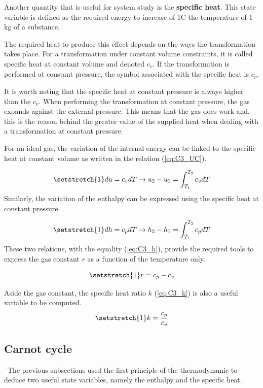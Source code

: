 Another quantity that is useful for system study is the \textbf{specific heat}. This state variable is defined as the required energy to increase of 1\degree C the temperature of 1 kg of a substance. 
 
The required heat to produce this effect depends on the ways the transformation takes place. For a transformation under constant volume constraints, it is called specific heat at constant volume and denoted $c_v$. If the transformation is performed at constant pressure, the symbol associated with the specific heat is $c_p$.

It is worth noting that the specific heat at constant pressure is always higher than the $c_v$. When performing the transformation at constant pressure, the gas expands against the external pressure. This means that the gas does work and, this is the reason behind the greater value of the supplied heat when dealing with a transformation at constant pressure. 

For an ideal gas, the variation of the internal energy can be linked to the specific heat at constant volume as written in the relation (\ref{eq:C3_UC}).

\begin{equation}
\setstretch{1}
du = c_vdT \rightarrow u_2 - u_1 = \int_{T_1}^{T_2} c_vdT\label{eq:C3_UC}
\end{equation} 
Similarly, the variation of the enthalpy can be expressed using the specific heat at constant pressure.

\begin{equation}
\setstretch{1}
dh = c_pdT \rightarrow h_2 - h_1 = \int_{T_1}^{T_2} c_pdT\label{eq:C3_UP}
\end{equation} 
These two relations, with the equality (\ref{eq:C3_h}), provide the required tools to express the gas constant $r$ as a function of the temperature only. 

\begin{equation}
\setstretch{1}
r = c_p - c_v \label{eq:C3_r}
\end{equation}

Aside the gas constant, the specific heat ratio $k$ (\ref{eq:C3_k}) is also a useful variable to be computed.
\begin{equation}
\setstretch{1}
k = \frac{c_p}{c_v} \label{eq:C3_k}
\end{equation}
\subsection{Carnot cycle}
\quad\, The previous subsections used the first principle of the thermodynamic to deduce two useful state variables, namely the enthalpy and the specific heat.

